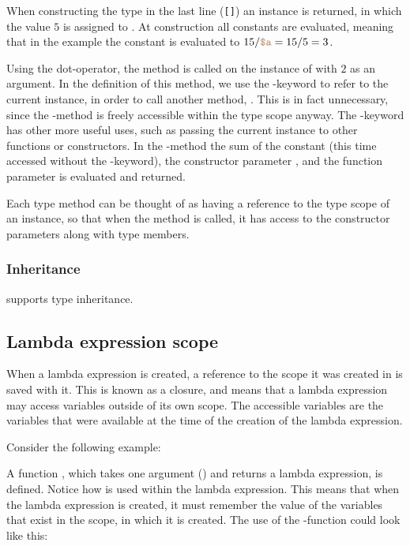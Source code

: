 When constructing the type in the last line (\texttt{[]})
an instance is returned, in which the value $5$ is assigned to .
At construction all constants are evaluated, meaning that in the example
the constant  is evaluated to $15 / \variable{a} = 15 / 5 = 3$.

Using the dot-operator, the method  is called on the instance of
 with $2$ as an argument. In the definition of this method, we use the
-keyword to refer to the current instance, in order to call another
method, . This is in fact unnecessary, since the
-method is freely accessible within the type scope anyway. The
-keyword has other more useful uses, such as passing the current
instance to other functions or constructors. In the -method
the sum of the constant  (this time accessed without the
-keyword), the constructor parameter , and the function
parameter  is evaluated and returned.

Each type method can be thought of as having a reference to the type scope of an
instance, so that when the method is called, it has access to the constructor 
parameters along with type members.

\subsubsection{Inheritance}

\productname{} supports type inheritance.

\subsection{Lambda expression scope}

When a lambda expression is created, a reference to the scope it was created in
is saved with it. This is known as a closure, and means that a lambda
expression may access variables outside of its own scope. The accessible
variables are the variables that were available at the time of the creation of
the lambda expression.

Consider the following example:


A function , which takes one argument () and
returns a lambda expression, is defined. Notice how  is used within
the lambda expression. This means that when the lambda expression is created, it
must remember the value of the variables that exist in the scope, in which it is
created. The use of the -function could look like this:

